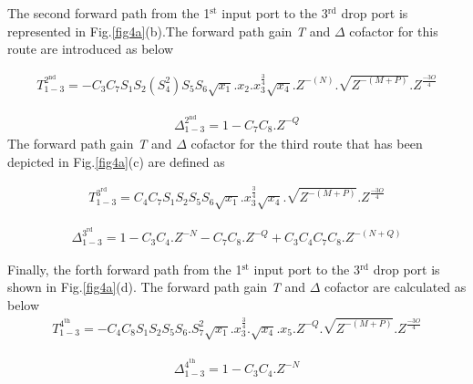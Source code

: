 \documentclass{osa-article}
\begin{document}
The second forward path from the 1$^{\text{st}}$ input port to the 3$^{\text{rd}}$ drop port is represented in Fig.\ref{fig4a}(b).The forward path gain \textit {T} and $\Delta$ cofactor for this route are introduced as below

\begin{equation}
\begin{split}
T^{2^{\text{nd}}}_{1-3}=-C_3C_7S_1S_2(S^2_4)S_5S_6\sqrt{x_1}.x_{2}.{x^{\frac{3}{4}}_3}\sqrt{x_4}.Z^{-(N)}.\sqrt{Z^{-(M+P)}}.Z^{\frac{-3O}{4}}
\end{split}
\end{equation}

\begin{equation}
\begin{split}
\Delta^{2^{\text{nd}}}_{1-3}=1-C_7C_8.Z^{-Q}
\end{split}
\end{equation}
The forward path gain \textit {T} and $\Delta$ cofactor for the third route that has been depicted in Fig.\ref{fig4a}(c) are defined as

\begin{equation}
\begin{split}
T^{3^{\text{rd}}}_{1-3}=C_4C_7S_1S_2S_5S_6\sqrt{x_1}.{x^{\frac{3}{4}}_3}\sqrt{x_4}.\sqrt{Z^{-(M+P)}}.Z^{\frac{-3O}{4}}
\end{split}
\end{equation}

\begin{equation}
\begin{split}
\Delta^{3^{\text{rd}}}_{1-3}=1-C_3C_4.Z^{-N}-C_7C_8.Z^{-Q}+C_3C_4C_7C_8.Z^{-(N+Q)}
\end{split}
\end{equation}

Finally, the forth forward path from the 1$^{\text{st}}$ input port to the 3$^{\text{rd}}$ drop port is shown in Fig.\ref{fig4a}(d). The forward path gain \textit {T} and $\Delta$ cofactor are calculated as below
\begin{equation}
\begin{split}
T^{4^{\text{th}}}_{1-3}=-C_4C_8S_1S_2S_5S_6.S^2_7\sqrt{x_1}.{x^{\frac{3}{4}}_3}.\sqrt{x_4}.x_5.Z^{-Q}.\sqrt{Z^{-(M+P)}}.Z^{\frac{-3O}{4}}
\end{split}
\end{equation}

\begin{equation}
\begin{split}
\Delta^{4^{\text{th}}}_{1-3}=1-C_3C_4.Z^{-N}
\end{split}
\end{equation}
\end{document}
